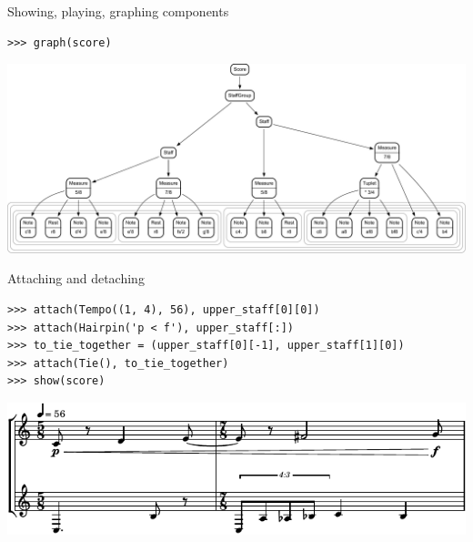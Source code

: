 \begin{frame}[fragile]{Showing, playing, graphing components}

\begin{abjadbookoutput}
\begin{singlespacing}
\vspace{-0.5\baselineskip}
\begin{verbatim}
>>> graph(score)
\end{verbatim}
\noindent\includegraphics[scale=0.4,max width=\textwidth,]{assets/graphviz-e2c3abddd31202013f11968c9bff5808.pdf}
\end{singlespacing}
\end{abjadbookoutput}

\end{frame}

\begin{frame}[fragile]{Attaching and detaching}

\begin{abjadbookoutput}
\begin{singlespacing}
\vspace{-0.5\baselineskip}
\begin{verbatim}
>>> attach(Tempo((1, 4), 56), upper_staff[0][0])
>>> attach(Hairpin('p < f'), upper_staff[:])
>>> to_tie_together = (upper_staff[0][-1], upper_staff[1][0])
>>> attach(Tie(), to_tie_together)
>>> show(score)
\end{verbatim}
\noindent\includegraphics[max width=\textwidth,]{assets/lilypond-93a2b38978bbd78fc9e299d85430127a.pdf}
\end{singlespacing}
\end{abjadbookoutput}

\end{frame}

